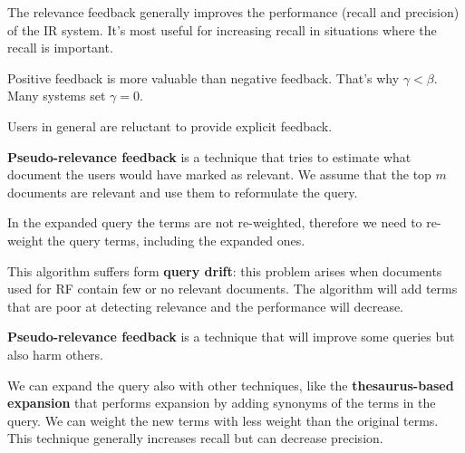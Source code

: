 The relevance feedback generally improves the performance
(recall and precision) of the IR system. It's most useful for
increasing recall in situations where the recall is important.

Positive feedback is more valuable than negative feedback.
That's why $\gamma<\beta$. Many systems set $\gamma=0$.

Users in general are reluctant to provide explicit feedback.

\textbf{Pseudo-relevance feedback} is a technique that
tries to estimate what document the users would have
marked as relevant. We assume that the top $m$ documents
are relevant and use them to reformulate the query.

In the expanded query the terms are not re-weighted, therefore
we need to re-weight the query terms, including the expanded ones.

This algorithm suffers form \textbf{query drift}: this problem
arises when documents used for RF contain few or no relevant
documents. The algorithm will add terms that are poor
at detecting relevance and the performance will decrease.

\textbf{Pseudo-relevance feedback} is a technique that
will improve some queries but also harm others.

We can expand the query also with other techniques, like
the \textbf{thesaurus-based expansion} that performs expansion
by adding synonyms of the terms in the query.
We can weight the new terms with less weight than the
original terms.
This technique generally increases recall but can
decrease precision.

